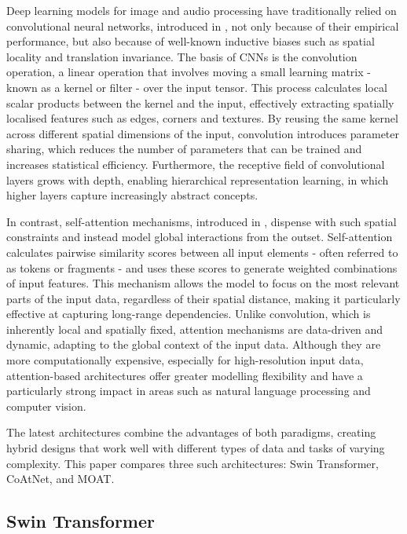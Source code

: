 \documentclass[a4paper,11pt,twoside]{report}
\theoremstyle{definition}
\begin{document}
Deep learning models for image and audio processing have traditionally relied on convolutional neural networks, introduced in \cite{cnn}, not only because of their empirical performance, but also because of well-known inductive biases such as spatial locality and translation invariance. The basis of CNNs is the convolution operation, a linear operation that involves moving a small learning matrix - known as a kernel or filter - over the input tensor. This process calculates local scalar products between the kernel and the input, effectively extracting spatially localised features such as edges, corners and textures. By reusing the same kernel across different spatial dimensions of the input, convolution introduces parameter sharing, which reduces the number of parameters that can be trained and increases statistical efficiency. Furthermore, the receptive field of convolutional layers grows with depth, enabling hierarchical representation learning, in which higher layers capture increasingly abstract concepts.

In contrast, self-attention mechanisms, introduced in \cite{vaswani2017attention}, dispense with such spatial constraints and instead model global interactions from the outset. Self-attention calculates pairwise similarity scores between all input elements - often referred to as tokens or fragments - and uses these scores to generate weighted combinations of input features. This mechanism allows the model to focus on the most relevant parts of the input data, regardless of their spatial distance, making it particularly effective at capturing long-range dependencies. Unlike convolution, which is inherently local and spatially fixed, attention mechanisms are data-driven and dynamic, adapting to the global context of the input data. Although they are more computationally expensive, especially for high-resolution input data, attention-based architectures offer greater modelling flexibility and have a particularly strong impact in areas such as natural language processing and computer vision.

The latest architectures combine the advantages of both paradigms, creating hybrid designs that work well with different types of data and tasks of varying complexity. This paper compares three such architectures: Swin Transformer, CoAtNet, and MOAT.

\subsection{Swin Transformer}
\end{document}
